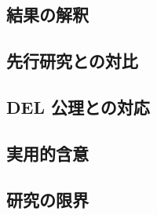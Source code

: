 
\subsection{結果の解釈}\label{subsec:interpretation}


\subsection{先行研究との対比}\label{subsec:comparison}


\subsection{DEL 公理との対応}\label{subsec:del-axioms}


\subsection{実用的含意}\label{subsec:implications}


\subsection{研究の限界}\label{subsec:limitations}


